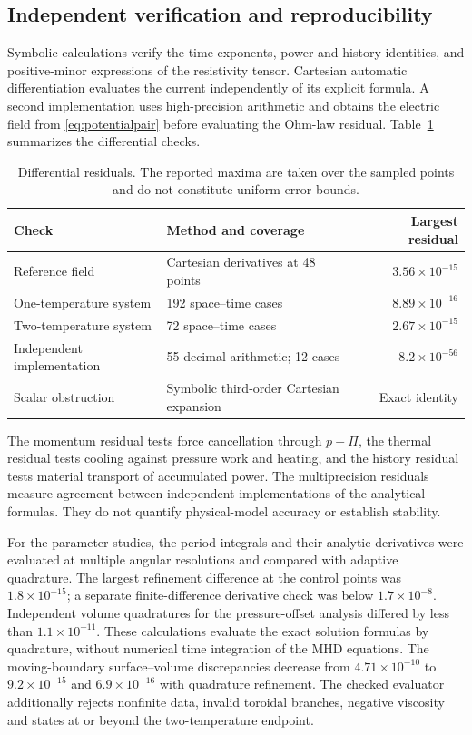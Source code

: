 \documentclass[11pt,a4paper]{article}
\theoremstyle{remark}\newtheorem{remark}{Remark}
\numberwithin{equation}{section}
\begin{document}
\subsection{Independent verification and reproducibility}
Symbolic calculations verify the time exponents, power and history identities, and positive-minor expressions of the resistivity tensor. Cartesian automatic differentiation evaluates the current independently of its explicit formula. A second implementation uses high-precision arithmetic and obtains the electric field from \eqref{eq:potentialpair} before evaluating the Ohm-law residual. Table~\ref{tab:residuals} summarizes the differential checks.
\begin{table}[htbp]
\centering\small
\caption{Differential residuals. The reported maxima are taken over the sampled points and do not constitute uniform error bounds.}
\label{tab:residuals}
\begin{tabularx}{\linewidth}{@{}p{.23\linewidth}Xr@{}}\toprule
Check & Method and coverage & Largest residual\\\midrule
Reference field & Cartesian derivatives at 48 points & $3.56\times10^{-15}$\\
One-temperature system & 192 space--time cases & $8.89\times10^{-16}$\\
Two-temperature system & 72 space--time cases & $2.67\times10^{-15}$\\
Independent implementation & 55-decimal arithmetic; 12 cases & $8.2\times10^{-56}$\\
Scalar obstruction & Symbolic third-order Cartesian expansion & Exact identity\\\bottomrule
\end{tabularx}
\end{table}
\FloatBarrier
The momentum residual tests force cancellation through $p-\Pi$, the thermal residual tests cooling against pressure work and heating, and the history residual tests material transport of accumulated power. The multiprecision residuals measure agreement between independent implementations of the analytical formulas. They do not quantify physical-model accuracy or establish stability.

For the parameter studies, the period integrals and their analytic derivatives were evaluated at multiple angular resolutions and compared with adaptive quadrature. The largest refinement difference at the control points was $1.8\times10^{-15}$; a separate finite-difference derivative check was below $1.7\times10^{-8}$. Independent volume quadratures for the pressure-offset analysis differed by less than $1.1\times10^{-11}$. These calculations evaluate the exact solution formulas by quadrature, without numerical time integration of the MHD equations. The moving-boundary surface--volume discrepancies decrease from $4.71\times10^{-10}$ to $9.2\times10^{-15}$ and $6.9\times10^{-16}$ with quadrature refinement. The checked evaluator additionally rejects nonfinite data, invalid toroidal branches, negative viscosity and states at or beyond the two-temperature endpoint.
\end{document}
